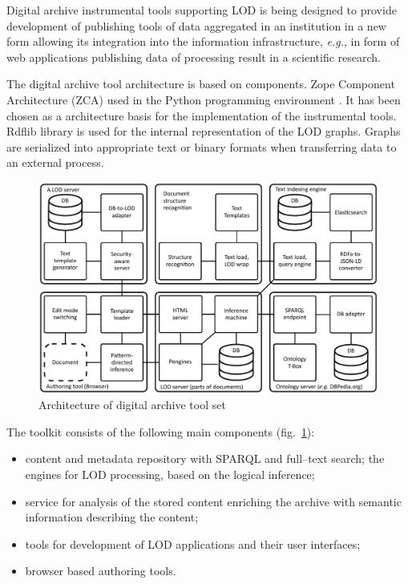\documentclass[conference,a4paper]{IEEEtran}
\begin{document}
Digital archive instrumental tools supporting LOD is being designed to provide development of publishing tools of data aggregated in an institution in a new form allowing its integration into the information infrastructure, \emph{e.g.}, in form of web applications publishing data of processing result in a scientific research.

The digital archive tool architecture is based on components. Zope Component Architecture (ZCA) \cite{b6} used in the Python programming environment \cite{b7}.  It has been chosen as a architecture basis for the implementation of the instrumental tools.  Rdflib library is used for the internal representation of the LOD graphs.  Graphs are serialized into appropriate text or binary formats when transferring data to an external process.

\begin{figure}
  \begin{center}
  \includegraphics[width=1\linewidth]{architecture-mda-lod-ext.pdf}
  \caption{Architecture of digital archive tool set} \label{fig:arch}
\end{center}
\end{figure}

The toolkit consists of the following main components (fig.~\ref{fig:arch}):
\begin{itemize}
\item content and metadata repository with SPARQL and full--text search; the engines for LOD processing, based on the logical inference;
\item service for analysis of the stored content enriching the archive with semantic information describing the content;
\item tools for development of LOD applications and their user interfaces;
\item browser based authoring tools.
\end{itemize}
\end{document}

